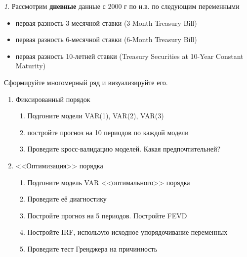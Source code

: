 \documentclass[12pt]{article}
\theoremstyle{remark}
\newtheorem{exercise}{}[subsection]
\begin{document}
\begin{exercise}
Рассмотрим \textbf{дневные} данные с 2000 г по н.в. по следующим переменными
\begin{itemize}
	\item первая разность 3-месячной ставки (3-Month Treasury Bill)
	\item первая разность 6-месячной ставки (6-Month Treasury Bill)
	\item первая разность 10-летней ставки (Treasury Securities at 10-Year Constant Maturity)
\end{itemize}
Сформируйте многомерный ряд и визуализируйте его.
\begin{enumerate}
	\item Фиксированный порядок
	\begin{enumerate}
		\item Подгоните модели VAR(1), VAR(2), VAR(3)
		\item постройте прогноз на 10 периодов по каждой модели
		\item Проведите кросс-валидацию моделей. Какая предпочтительней?
	\end{enumerate}
	\item <<Оптимизация>> порядка
	\begin{enumerate}
		\item Подгоните модель VAR <<оптимального>> порядка
		\item Проведите её диагностику
		\item Постройте прогноз на 5 периодов. Постройте FEVD
		\item Постройте IRF, использую исходное упорядочивание переменных
		\item Проведите тест Гренджера на причинность
	\end{enumerate}
\end{enumerate}
\end{exercise}
\end{document}
